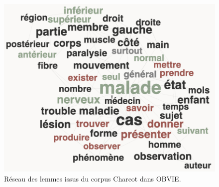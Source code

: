 	\begin{figure}[h]
	\centering
	\includegraphics[width=.8\textwidth]{img/reseau_charcot.png}
	\caption{Réseau des lemmes issus du corpus Charcot dans \textsc{OBVIE}.}
	\label{fig:reseau_corpus}
\end{figure}


